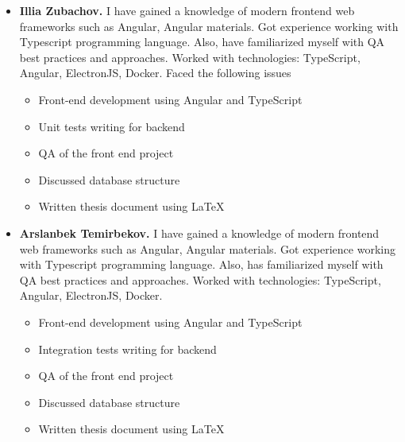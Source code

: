 \begin{itemize}
\begin{itemize}
        Thesis document deployment on GitHub Pages
        \item Discussed database structure
        \item Written thesis document using \LaTeX
        \item Implemented mobile client application using WebView
        \item Front-end development using Angular and TypeScript
    \end{itemize}
    \item \textbf{Illia Zubachov.} I have gained a knowledge of modern frontend web frameworks such as
    Angular, Angular materials.
    Got experience working with Typescript programming language.
    Also, have familiarized myself with QA best practices and approaches.
    Worked with technologies: TypeScript, Angular, ElectronJS, Docker.
    Faced the following issues
    \begin{itemize}
        \item Front-end development using Angular and TypeScript
        \item Unit tests writing for backend
        \item QA of the front end project
        \item Discussed database structure
        \item Written thesis document using \LaTeX
    \end{itemize}
    \item \textbf{Arslanbek Temirbekov.} I have gained a knowledge of modern frontend web frameworks such as
    Angular, Angular materials.
    Got experience working with Typescript programming language.
    Also, has familiarized myself with QA best practices and approaches.
    Worked with technologies: TypeScript, Angular, ElectronJS, Docker.
    \begin{itemize}
        \item Front-end development using Angular and TypeScript
        \item Integration tests writing for backend
        \item QA of the front end project
        \item Discussed database structure
        \item Written thesis document using \LaTeX
    \end{itemize}
\end{itemize}